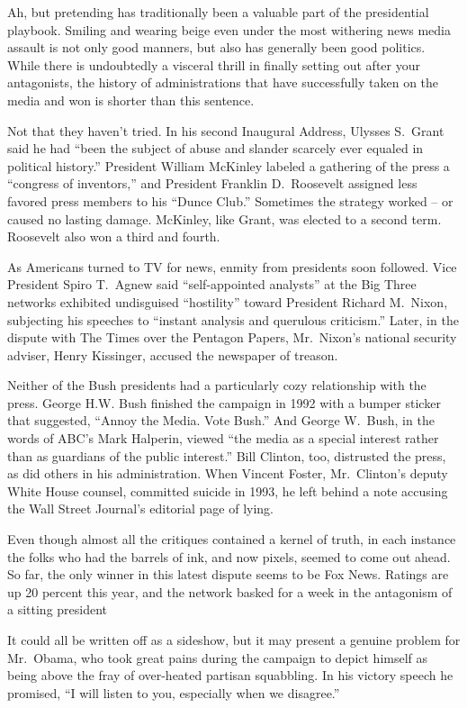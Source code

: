 ﻿\documentclass[12pt]{article}
\begin{document}
Ah, but pretending has traditionally been a valuable part of the presidential playbook. Smiling and
wearing beige even under the most withering news media assault is not only good manners, but also
has generally been good politics. While there is undoubtedly a visceral thrill in finally setting
out after your antagonists, the history of administrations that have successfully taken on the media
and won is shorter than this sentence.

Not that they haven't tried. In his second Inaugural Address, Ulysses S.~Grant said he had ``been
the subject of abuse and slander scarcely ever equaled in political history.'' President William
McKinley labeled a gathering of the press a ``congress of inventors,'' and President Franklin
D.~Roosevelt assigned less favored press members to his ``Dunce Club.'' Sometimes the strategy
worked -- or caused no lasting damage. McKinley, like Grant, was elected to a second term. Roosevelt
also won a third and fourth.

As Americans turned to TV for news, enmity from presidents soon followed. Vice President Spiro
T.~Agnew said ``self-appointed analysts'' at the Big Three networks exhibited undisguised
``hostility'' toward President Richard M.~Nixon, subjecting his speeches to ``instant analysis and
querulous criticism.'' Later, in the dispute with The Times over the Pentagon Papers, Mr.~Nixon's
national security adviser, Henry Kissinger, accused the newspaper of treason.

Neither of the Bush presidents had a particularly cozy relationship with the press. George H.W. Bush
finished the campaign in 1992 with a bumper sticker that suggested, ``Annoy the Media. Vote Bush.''
And George W.~Bush, in the words of ABC's Mark Halperin, viewed ``the media as a special interest
rather than as guardians of the public interest.'' Bill Clinton, too, distrusted the press, as did
others in his administration. When Vincent Foster, Mr.~Clinton's deputy White House counsel,
committed suicide in 1993, he left behind a note accusing the Wall Street Journal's editorial page
of lying.

Even though almost all the critiques contained a kernel of truth, in each instance the folks who had
the barrels of ink, and now pixels, seemed to come out ahead. So far, the only winner in this latest
dispute seems to be Fox News. Ratings are up 20 percent this year, and the network basked for a week
in the antagonism of a sitting president

It could all be written off as a sideshow, but it may present a genuine problem for Mr.~Obama, who
took great pains during the campaign to depict himself as being above the fray of over-heated
partisan squabbling. In his victory speech he promised, ``I will listen to you, especially when we
disagree.''
\end{document}
